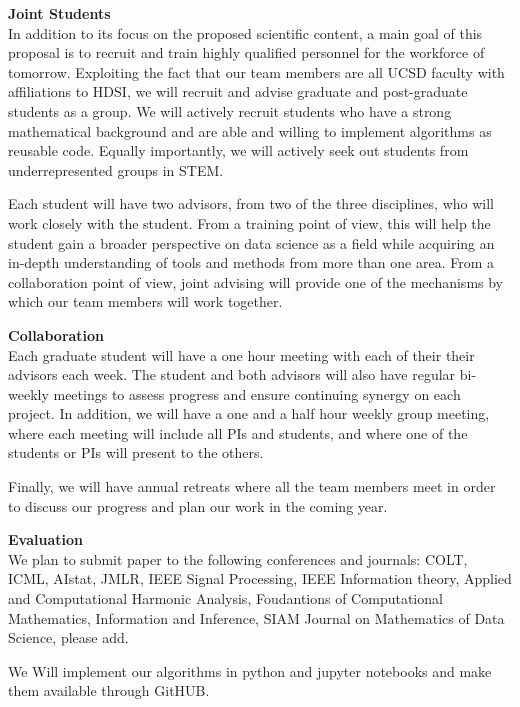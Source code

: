 \documentclass{article}
\begin{document}
{\bf Joint Students}\\
  In
addition to its focus on the proposed scientific content, a main goal
of this proposal is to recruit and train highly qualified personnel
for the workforce of tomorrow. Exploiting the fact that our team
members are all UCSD faculty with affiliations to HDSI, we will
recruit and advise graduate and post-graduate students as a group. We
will actively recruit students who have a strong mathematical
background and are able and willing to implement algorithms as
reusable code. Equally importantly, we will actively seek out students
from underrepresented groups in STEM.

Each student will have two advisors, from two of the three
disciplines, who will work closely with the student. From a training
point of view, this will help the student gain a broader perspective
on data science as a field while acquiring an in-depth understanding
of tools and methods from more than one area. From a collaboration
point of view, joint advising will provide one of the mechanisms by
which our team members will work together.

{\bf Collaboration}\\   Each
graduate student will have a one hour meeting with each of their their
advisors each week. The student and both advisors will also have
regular bi-weekly meetings to assess progress and ensure continuing
synergy on each project.  In addition, we will have a one and a half
hour weekly group meeting, where each meeting will include all PIs and
students, and where one of the students or PIs will present to the
others.

Finally, we will have annual retreats where all the team members meet
in order to discuss our progress and plan our work in the coming year.

{\bf Evaluation}\\
We plan to submit paper to the following conferences and journals:
COLT, ICML, AIstat, JMLR, IEEE Signal Processing, IEEE Information
theory, Applied and Computational Harmonic Analysis, Foudantions of Computational Mathematics, Information and Inference, SIAM Journal on Mathematics of Data Science, please add.

We Will implement our algorithms in python and jupyter notebooks and
make them available through GitHUB.
\end{document}
